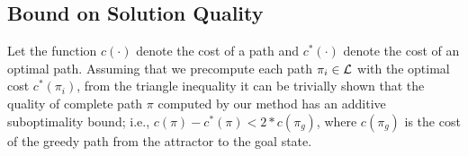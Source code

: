 \documentclass[a4paper]{report}
\begin{document}
\subsection{Bound on Solution Quality}
\label{subsec:quality}
Let the function $c(\cdot)$ denote the cost of a path and $c^*(\cdot)$ denote the cost of an optimal path. Assuming that we precompute each path $\pi_i \in \mathcal{L}$ with the optimal cost $c^*(\pi_i)$, from the triangle inequality it can be trivially shown that the quality of complete path $\pi$ computed by our method has an additive suboptimality bound; i.e.,
 $c(\pi) - c^*(\pi) < 2 * c(\pi_g)$,
where $c(\pi_g)$ is the cost of the greedy path from the attractor to the goal state.

%
\end{document}
